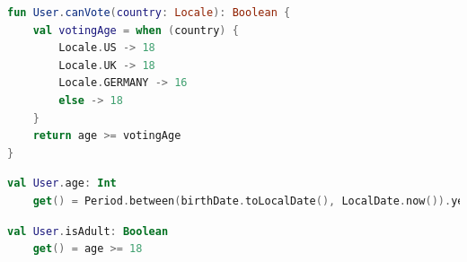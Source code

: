 \begin{lstlisting}[caption=Extension function sprawdzające czy użytkownik jest uprawniony do głosowania w w danym kraju, language=Kotlin]
fun User.canVote(country: Locale): Boolean {
    val votingAge = when (country) {
        Locale.US -> 18
        Locale.UK -> 18
        Locale.GERMANY -> 16
        else -> 18
    }
    return age >= votingAge
}
\end{lstlisting}

\begin{lstlisting}[caption=Extension property zwracające wiek użytkownika, language=Kotlin]
val User.age: Int
    get() = Period.between(birthDate.toLocalDate(), LocalDate.now()).years
\end{lstlisting}

\begin{lstlisting}[caption=Extension property zwracające czy użytkownik jest powyżej 18 roku życia, language=Kotlin]
val User.isAdult: Boolean
    get() = age >= 18
\end{lstlisting}

